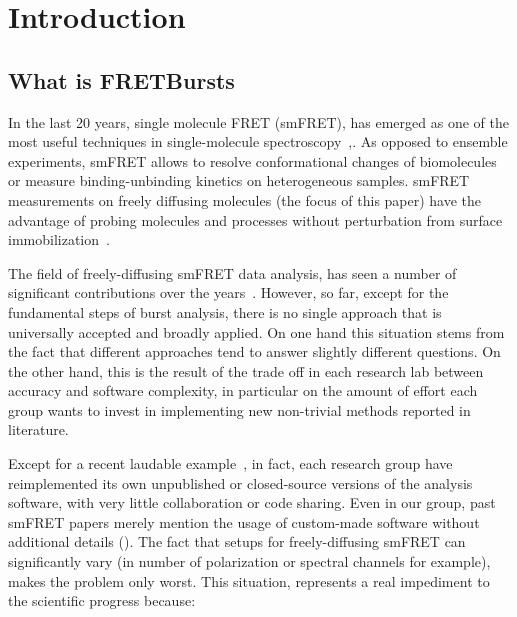 \section{Introduction}

\subsection{What is FRETBursts}

In the last 20 years, single molecule FRET (smFRET), has emerged as one of the most
useful techniques in single-molecule spectroscopy~\cite{Weiss_1999},\cite{Hohlbein_2014}. 
As opposed to ensemble experiments, smFRET allows to resolve conformational 
changes of biomolecules or measure binding-unbinding kinetics on heterogeneous samples. 
smFRET measurements on freely diffusing molecules (the focus of this paper) have the advantage 
of probing molecules and processes without perturbation from surface immobilization~\cite{Dahan_1999}\cite{Eggeling_1998}. 

The field of freely-diffusing smFRET data analysis, has seen a number of significant 
contributions over the years~\cite{Fries_1998}\cite{Eggeling_2001}\cite{Zhang_2005}\cite{Gopich_2005}\cite{Lee_2005}\cite{Nir_2006}\cite{Antonik2006}\cite{Gopich_2007}\cite{Gopich_2008}\cite{Camley_2009}\cite{Santoso_2010}\cite{Torella_2011}\cite{Tomov_2012}. However, so far, except for the fundamental steps of burst analysis, 
there is no single approach that is universally accepted and broadly applied. 
On one hand this situation stems from the fact that
different approaches tend to answer slightly different questions.
On the other hand, this is the result of the trade off in each research lab
between accuracy and software complexity, in particular on the amount of effort
each group wants to invest in implementing new non-trivial methods reported in literature.

Except for a recent laudable example~\cite{Murphy2014}, in fact,
each research group have reimplemented its own unpublished or closed-source versions
of the analysis software, with very little collaboration or code sharing.
Even in our group, past smFRET papers merely mention the usage of custom-made software without 
additional details (\cite{Lee_2005}\cite{Nir_2006}).
The fact that setups for freely-diffusing smFRET can significantly 
vary (in number of polarization or spectral channels for example), 
makes the problem only worst.
This situation, represents a real impediment to the scientific progress because:


